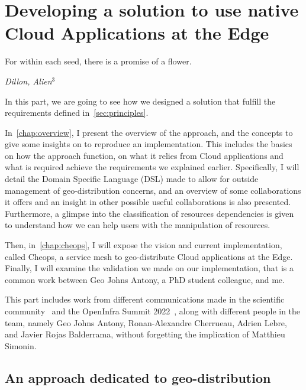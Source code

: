 \part{Developing a solution to use native Cloud Applications at the Edge}
\label{part:cheops}

\epigraph{For within each seed, there is a promise of a flower.}{\emph{Dillon, Alien$^3$}}



In this part, we are going to see how we designed a solution that
fulfill the requirements defined in~\autoref{sec:principles}.

%
In~\autoref{chap:overview}, I present the overview of the approach,
and the concepts to give some insights on to reproduce an
implementation.
%
This includes the basics on how the approach function, on what it
relies from Cloud applications and what is required achieve the
requirements we explained earlier.
%
Specifically, I will detail the Domain Specific Language
(\acrshort{DSL}) made to allow for outside management of
geo-distribution concerns, and an overview of some collaborations it
offers and an insight in other possible useful collaborations is also
presented.
%
Furthermore, a glimpse into the classification of resources
dependencies is given to understand how we can help users with the
manipulation of resources.

Then, in~\autoref{chap:cheops}, I will expose the vision and current
implementation, called Cheops, a service mesh to geo-distribute Cloud
applications at the Edge.
%
%
Finally, I will examine the validation we made on our implementation,
that is a common work between Geo Johns Antony, a PhD student
colleague, and me.

This part includes work from different communications made in the
scientific community~\cite{CLRB19, CDLR+20, CDL21, DCL21,
  compas-poster, DAL22} and the OpenInfra Summit
2022~\cite{OIS-Berlin22}, along with different people in the team,
namely Geo Johns Antony, Ronan-Alexandre Cherrueau, Adrien Lebre, and
Javier Rojas Balderrama, without forgetting the implication of
Matthieu Simonin.


\chapter{An approach dedicated to geo-distribution}
\label{chap:overview}


